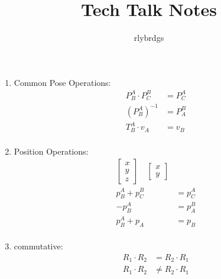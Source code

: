 \documentclass{article}
\title{Tech Talk Notes}
\author{rlybrdgs }
\begin{document}
\maketitle
\begin{enumerate}
    \item Common Pose Operations:
    \begin{align*}
        P^A_B \cdot P^B_C &= P^A_C \\
        \left(P^A_B\right)^{-1} &= P^B_A \\
        T^A_B \cdot v_A &= v_B \\
    \end{align*}

    \item Position Operations:
    \begin{align*}
        \begin{bmatrix}
            x \\ y \\ z
        \end{bmatrix} \quad \begin{bmatrix}
            x \\ y
        \end{bmatrix} \\
        p^A_B + p^B_C &= p^A_C \\
        -p^A_B &= p^B_A \\
        p^A_B + p_A &= p_B \\
    \end{align*}

    \item commutative:
    \begin{align*}
        R_1 \cdot R_2 &= R_2 \cdot R_1 \\
        R_1 \cdot R_2 &\neq R_2 \cdot R_1 \\
    \end{align*}


\end{enumerate}
\end{document}
